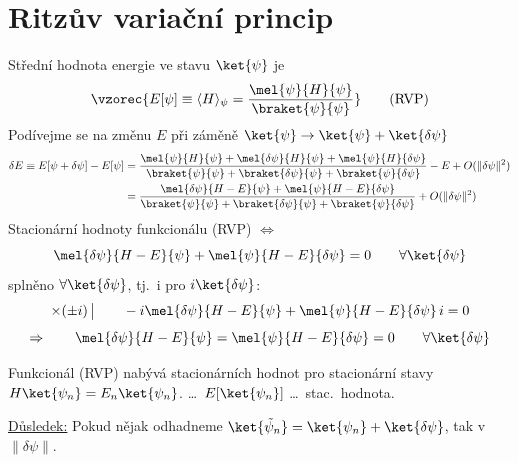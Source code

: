 \section{Ritzův variační princip}

Střední hodnota energie ve stavu $\ket{\psi}$ je
\[
  \vzorec{E[\psi] \equiv \langle H\rangle_\psi = \frac{\mel{\psi}{H}{\psi}}{\braket{\psi}{\psi}}} \qquad\text{(RVP)}
\]
Podívejme se na změnu $E$ při záměně $\ket{\psi}\to\ket{\psi} + \ket{\delta\psi}$
\begin{align*}
  \delta E \equiv E[\psi + \delta\psi] - E[\psi]
  &= \frac{\mel{\psi}{H}{\psi} + \mel{\delta\psi}{H}{\psi} + \mel{\psi}{H}{\delta\psi}}{\braket{\psi}{\psi} + \braket{\delta\psi}{\psi} + \braket{\psi}{\delta\psi}} - E + O(\|\delta\psi\|^2) \\
  &= \frac{\mel{\delta\psi}{H - E}{\psi} + \mel{\psi}{H - E}{\delta\psi}}{\braket{\psi}{\psi} + \braket{\delta\psi}{\psi} + \braket{\psi}{\delta\psi}} + O(\|\delta\psi\|^2)
\end{align*}
Stacionární hodnoty funkcionálu (RVP) $\Leftrightarrow$
\[
  \mel{\delta\psi}{H - E}{\psi} + \mel{\psi}{H - E}{\delta\psi} = 0 \qquad \forall\ket{\delta\psi}
\]
splněno $\forall\ket{\delta\psi}$, tj.\ i pro $i\ket{\delta\psi}$:
\[
  \times(\pm i)\,\big| \qquad -i\mel{\delta\psi}{H - E}{\psi} + \mel{\psi}{H - E}{\delta\psi}\,i = 0
\]
\[
  \Rightarrow\qquad \mel{\delta\psi}{H - E}{\psi} = \mel{\psi}{H - E}{\delta\psi} = 0 \qquad \forall\ket{\delta\psi}
\]

\begin{veta}[Tvrzení 1]
Funkcionál (RVP) nabývá stacionárních hodnot pro stacionární stavy $H\ket{\psi_n} = E_n\ket{\psi_n}$. \quad \dots\ $E[\ket{\psi_n}]$ \dots\ stac.\ hodnota.
\end{veta}

\underline{Důsledek:} Pokud nějak odhadneme $\ket{\tilde\psi_n} = \ket{\psi_n} + \ket{\delta\psi}$, tak  v $\|\delta\psi\|$.

